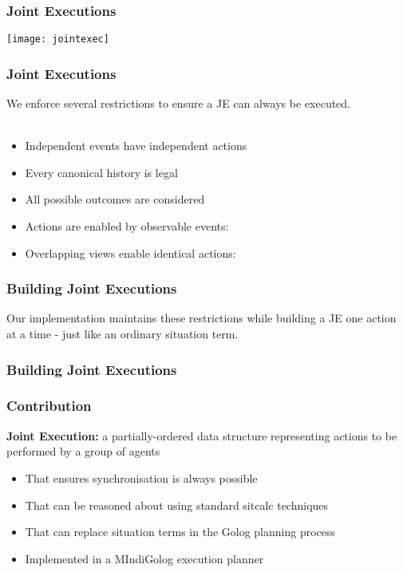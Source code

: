 \documentclass{beamer}
\begin{document}
\begin{frame}
\frametitle{Joint Executions}
\begin{center}
  \texttt{[image: jointexec]}
\end{center}
\end{frame}

\begin{frame}
\frametitle{Joint Executions}
We enforce several restrictions to ensure a JE can always be executed.
\ \\
\ \\
\begin{itemize}
\item Independent events have independent actions
\item Every canonical history is legal
\item All possible outcomes are considered
\item Actions are enabled by observable events:
\item Overlapping views enable identical actions:
\end{itemize}
\end{frame}

\begin{frame}
\frametitle{Building Joint Executions}
Our implementation maintains these restrictions while building a JE one action 
at a time - just like an ordinary situation term.


\end{frame}

\begin{frame}
\frametitle{Building Joint Executions}

\tiny

\normalsize

\end{frame}

\begin{frame}
\frametitle{Contribution}
\textbf{Joint Execution:}  a partially-ordered data structure representing actions to be performed by a group of agents
\begin{itemize}
\item That ensures synchronisation is always possible
\item That can be reasoned about using standard sitcalc techniques
\item That can replace situation terms in the Golog planning process
\item Implemented in a MIndiGolog execution planner
\end{itemize}
\end{frame}
\end{document}
